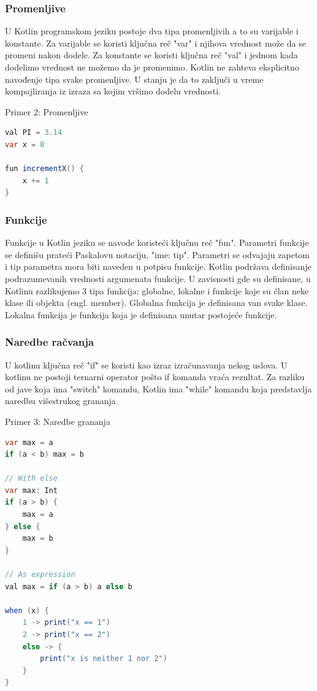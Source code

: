 \documentclass[12pt,oneside]{memoir}
\begin{document}
\subsubsection{Promenljive}
U Kotlin programskom jeziku postoje dva tipa promenljivih a to su varijable i konstante. Za varijable se koristi ključna reč "var" i njihova vrednost može da se promeni nakon dodele. Za konstante se koristi ključna reč "val" i jednom kada dodelimo vrednost ne možemo da je promenimo. Kotlin ne zahteva eksplicitno navođenje tipa svake promenljive. U stanju je da to zaključi u vreme kompajliranja iz izraza sa kojim vršimo dodelu vrednosti.

\begin{center} Primer 2: Promenljive\end{center}
\begin{lstlisting}[language=Java]
val PI = 3.14
var x = 0
 
fun incrementX() { 
    x += 1 
}
\end{lstlisting}
 
\subsubsection{Funkcije}
Funkcije u Kotlin jeziku se navode koristeći ključnu reč "fun". Parametri funkcije se definišu prateći Paskalovu notaciju, "ime: tip". Parametri se odvajaju zapetom i tip parametra mora biti naveden u potpisu funkcije. Kotlin podržava definisanje podrazumevanih vrednosti argumenata funkcije. U zavisnosti gde su definisane, u Kotlinu razlikujemo 3 tipa funkcija: globalne, lokalne i funkcije koje su član neke klase ili objekta (engl. member). Globalna funkcija je definisana van svake klase. Lokalna funkcija je funkcija koja je definisana unutar postojeće funkcije.
 
\subsubsection{Naredbe račvanja}
 
U kotlinu ključna reč "if" se koristi kao izraz izračunavanja nekog uslova. U kotlinu ne postoji ternarni operator pošto if komanda vraća rezultat. Za razliku od jave koja ima "switch" komandu, Kotlin ima "while" komandu koja predstavlja naredbu višestrukog grananja

\begin{center} Primer 3: Naredbe grananja\end{center}
\begin{lstlisting}[language=Java]
var max = a
if (a < b) max = b
 
// With else
var max: Int
if (a > b) {
    max = a
} else {
    max = b
}
 
// As expression
val max = if (a > b) a else b
 
when (x) {
    1 -> print("x == 1")
    2 -> print("x == 2")
    else -> {
        print("x is neither 1 nor 2")
    }
}
\end{lstlisting}
 
\end{document}
